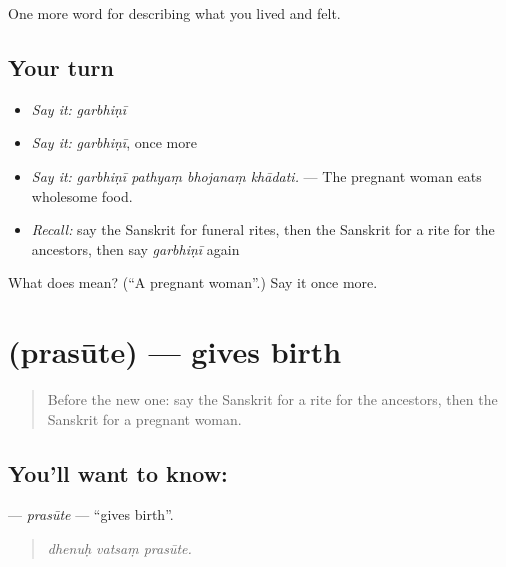 \begin{grammarlens}[title={What you've built}]
One more word for describing what you lived and felt.
\end{grammarlens}

\subsection*{Your turn}
\begin{itemize}
\raggedright
  \item \emph{Say it:} \emph{garbhiṇī}
  \item \emph{Say it:} \emph{garbhiṇī}, once more
  \item \emph{Say it:} \emph{garbhiṇī pathyaṃ bhojanaṃ khādati.} — The pregnant woman eats wholesome food.
  \item \emph{Recall:} say the Sanskrit for funeral rites, then the Sanskrit for a rite for the ancestors, then say \emph{garbhiṇī} again
\end{itemize}

\begin{tcolorbox}[breakable,colback=teal!4,colframe=teal!35!black,title={Before you move on}]
What does  mean? (\textquotedblleft{}A pregnant woman\textquotedblright{}.) Say it once more.
\end{tcolorbox}
\section[\texorpdfstring{\sk{प्रसूते} (prasūte)}{प्रसूते (prasūte)}]{ (prasūte) — gives birth}

\label{lesson:SA-C492-prasute}



\begin{quote}
Before the new one: say the Sanskrit for a rite for the ancestors, then the Sanskrit for a pregnant woman.
\end{quote}

\subsection*{You'll want to know: }
\textbf{} — \emph{prasūte} — \textquotedblleft{}gives birth\textquotedblright{}.

\begin{quote}
  
\end{quote}

\begin{quote}
\emph{dhenuḥ vatsaṃ prasūte.}
\end{quote}

